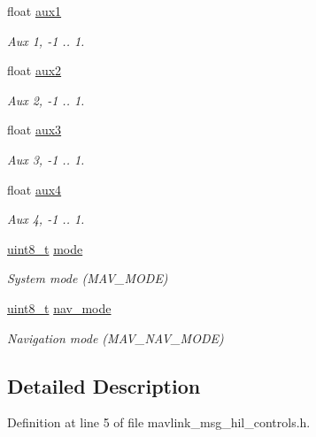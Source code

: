 \begin{DoxyCompactItemize}
float \hyperlink{struct____mavlink__hil__controls__t_ae8a7a69971e009abc390ed6f1950936a}{aux1}
\begin{DoxyCompactList}\small\item\em Aux 1, -\/1 .. 1. \end{DoxyCompactList}\item 
float \hyperlink{struct____mavlink__hil__controls__t_a34ee57a5807ad445506db9ba666e13d1}{aux2}
\begin{DoxyCompactList}\small\item\em Aux 2, -\/1 .. 1. \end{DoxyCompactList}\item 
float \hyperlink{struct____mavlink__hil__controls__t_ac90aa43f5be0ad189f9e42a4afec883f}{aux3}
\begin{DoxyCompactList}\small\item\em Aux 3, -\/1 .. 1. \end{DoxyCompactList}\item 
float \hyperlink{struct____mavlink__hil__controls__t_a0b636589ba52581e9e7cde07f8f90e12}{aux4}
\begin{DoxyCompactList}\small\item\em Aux 4, -\/1 .. 1. \end{DoxyCompactList}\item 
\hyperlink{stdint_8h_aba7bc1797add20fe3efdf37ced1182c5}{uint8\-\_\-t} \hyperlink{struct____mavlink__hil__controls__t_a44828f146b2d8fa81c7da0e844a18e39}{mode}
\begin{DoxyCompactList}\small\item\em System mode (M\-A\-V\-\_\-\-M\-O\-D\-E) \end{DoxyCompactList}\item 
\hyperlink{stdint_8h_aba7bc1797add20fe3efdf37ced1182c5}{uint8\-\_\-t} \hyperlink{struct____mavlink__hil__controls__t_adcc556cd52256501a39b1f9e962ca5b6}{nav\-\_\-mode}
\begin{DoxyCompactList}\small\item\em Navigation mode (M\-A\-V\-\_\-\-N\-A\-V\-\_\-\-M\-O\-D\-E) \end{DoxyCompactList}\end{DoxyCompactItemize}


\subsection{Detailed Description}


Definition at line 5 of file mavlink\-\_\-msg\-\_\-hil\-\_\-controls.\-h.



